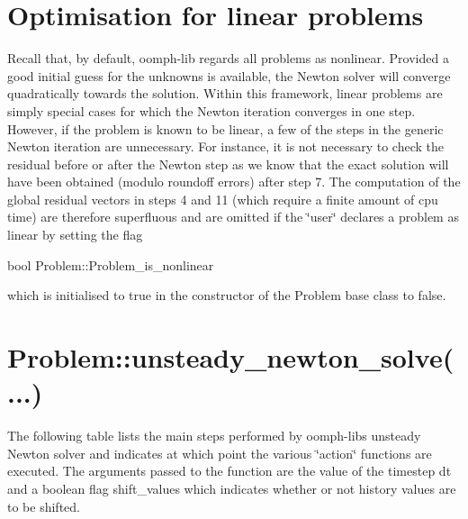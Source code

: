  

\hypertarget{index_opt}{}\section{Optimisation for linear problems}\label{index_opt}
Recall that, by default, {\ttfamily oomph-\/lib} regards all problems as nonlinear. Provided a good initial guess for the unknowns is available, the Newton solver will converge quadratically towards the solution. Within this framework, linear problems are simply special cases for which the Newton iteration converges in one step. However, if the problem is known to be linear, a few of the steps in the generic Newton iteration are unnecessary. For instance, it is not necessary to check the residual before or after the Newton step as we know that the exact solution will have been obtained (modulo roundoff errors) after step 7. The computation of the global residual vectors in steps 4 and 11 (which require a finite amount of cpu time) are therefore superfluous and are omitted if the \char`\"{}user\char`\"{} declares a problem as linear by setting the flag 
\begin{DoxyCode}
\textcolor{keywordtype}{bool} Problem::Problem\_is\_nonlinear
\end{DoxyCode}
 which is initialised to {\ttfamily true} in the constructor of the {\ttfamily Problem} base class to {\ttfamily false}.



 

\hypertarget{index_unsteady_newton_solve}{}\section{Problem\+::unsteady\+\_\+newton\+\_\+solve(...)}\label{index_unsteady_newton_solve}
The following table lists the main steps performed by {\ttfamily oomph-\/lib\textquotesingle{}s} unsteady Newton solver and indicates at which point the various \char`\"{}action\char`\"{} functions are executed. The arguments passed to the function are the value of the timestep {\ttfamily dt} and a boolean flag {\ttfamily shift\+\_\+values} which indicates whether or not history values are to be shifted.

